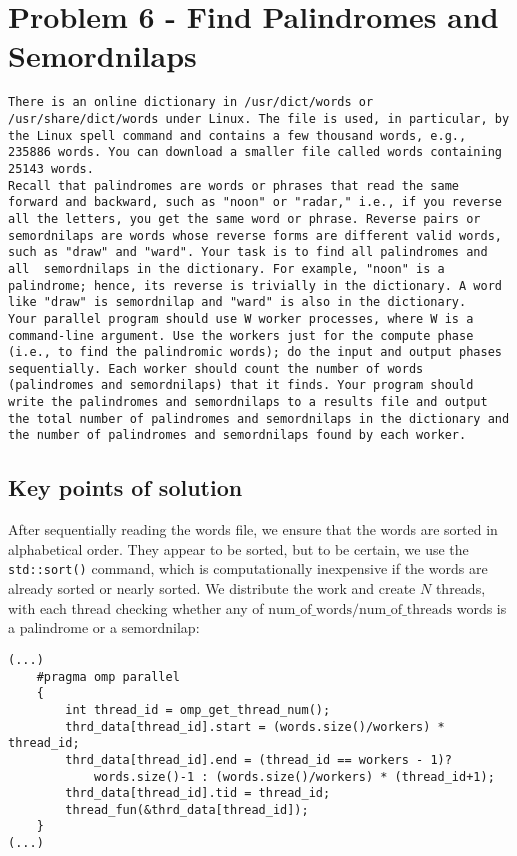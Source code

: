 \documentclass[a4paper,11pt]{article}
\begin{document}
\section*{Problem 6 - Find Palindromes and Semordnilaps}
\begin{verbatim}
There is an online dictionary in /usr/dict/words or /usr/share/dict/words under Linux. The file is used, in particular, by the Linux spell command and contains a few thousand words, e.g., 235886 words. You can download a smaller file called words containing 25143 words.
Recall that palindromes are words or phrases that read the same forward and backward, such as "noon" or "radar," i.e., if you reverse all the letters, you get the same word or phrase. Reverse pairs or semordnilaps are words whose reverse forms are different valid words, such as "draw" and "ward". Your task is to find all palindromes and all  semordnilaps in the dictionary. For example, "noon" is a palindrome; hence, its reverse is trivially in the dictionary. A word like "draw" is semordnilap and "ward" is also in the dictionary.
Your parallel program should use W worker processes, where W is a command-line argument. Use the workers just for the compute phase (i.e., to find the palindromic words); do the input and output phases sequentially. Each worker should count the number of words (palindromes and semordnilaps) that it finds. Your program should write the palindromes and semordnilaps to a results file and output the total number of palindromes and semordnilaps in the dictionary and the number of palindromes and semordnilaps found by each worker.
\end{verbatim}


\subsection*{Key points of solution}
After sequentially reading the words file, we ensure that the words are sorted in alphabetical order. They appear to be sorted, but to be certain, we use the \texttt{std::sort()} command, which is computationally inexpensive if the words are already sorted or nearly sorted. We distribute the work and create $N$ threads, with each thread checking whether any of $\text{num\_of\_words} / \text{num\_of\_threads}$ words is a palindrome or a semordnilap:
\newpage
\begin{verbatim}
(...)
    #pragma omp parallel
    {
        int thread_id = omp_get_thread_num();
        thrd_data[thread_id].start = (words.size()/workers) * thread_id;
        thrd_data[thread_id].end = (thread_id == workers - 1)? 
            words.size()-1 : (words.size()/workers) * (thread_id+1);
        thrd_data[thread_id].tid = thread_id;
        thread_fun(&thrd_data[thread_id]);
    }
(...)
\end{verbatim}
\end{document}
